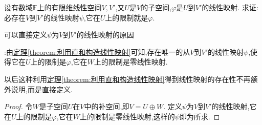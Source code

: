 \documentclass[../../main.tex]{subfiles}%
\begin{document}
\begin{proposition}
设有数域\(\mathbb{F}\)上的有限维线性空间\(V,V'\),又\(U\)是\(V\)的子空间,\(\varphi\)是\(U\)到\(V'\)的线性映射. 求证:必存在\(V\)到\(V'\)的线性映射\(\psi\),它在\(U\)上的限制就是\(\varphi\).
\end{proposition}
\begin{note}
\hypertarget{直接定义\(\psi\)为\(V\)到\(V'\)的线性映射的原因}{可以直接定义\(\psi\)为\(V\)到\(V'\)的线性映射的原因}:由\hyperref[theorem:利用直和构造线性映射]{定理\ref{theorem:利用直和构造线性映射}}可知,存在唯一的从\(V\)到\(V'\)的线性映射\(\psi\),使得它在\(U\)上的限制是\(\varphi\),它在\(W\)上的限制是零线性映射.

以后这种利用\hyperref[theorem:利用直和构造线性映射]{定理\ref{theorem:利用直和构造线性映射}}得到线性映射的存在性不再额外说明,而是直接定义.
\end{note}
\begin{proof}
令\(W\)是子空间\(U\)在\(V\)中的补空间,即\(V = U\oplus W\). \hypertarget{直接定义\(\psi\)为\(V\)到\(V'\)的线性映射的原因}{定义\(\psi\)为\(V\)到\(V'\)的线性映射},它在\(U\)上的限制是\(\varphi\),它在\(W\)上的限制是零线性映射,这样的\(\psi\)即为所求.     
\end{proof}
\end{document}
